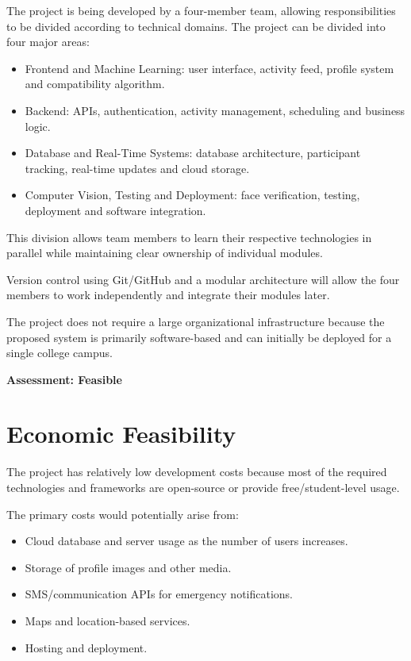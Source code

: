 \documentclass{tietreport}
\begin{document}
The project is being developed by a four-member team, allowing responsibilities to be
divided according to technical domains. The project can be divided into four major areas:

\begin{itemize}[nosep]
  \item Frontend and Machine Learning: user interface, activity feed, profile system and
        compatibility algorithm.
  \item Backend: APIs, authentication, activity management, scheduling and business logic.
  \item Database and Real-Time Systems: database architecture, participant tracking,
        real-time updates and cloud storage.
  \item Computer Vision, Testing and Deployment: face verification, testing, deployment
        and software integration.
\end{itemize}

This division allows team members to learn their respective technologies in parallel
while maintaining clear ownership of individual modules.

Version control using Git/GitHub and a modular architecture will allow the four members
to work independently and integrate their modules later.

The project does not require a large organizational infrastructure because the proposed
system is primarily software-based and can initially be deployed for a single college
campus.

\noindent\textbf{Assessment: Feasible}

\section{Economic Feasibility}

The project has relatively low development costs because most of the required
technologies and frameworks are open-source or provide free/student-level usage.

The primary costs would potentially arise from:

\begin{itemize}[nosep]
  \item Cloud database and server usage as the number of users increases.
  \item Storage of profile images and other media.
  \item SMS/communication APIs for emergency notifications.
  \item Maps and location-based services.
  \item Hosting and deployment.
\end{itemize}
\end{document}
